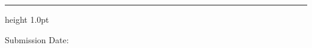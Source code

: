 \begin{titlepage}
\begin{singlespace}
\begin{center}
        \vfill
        
        \hrule height 1.0pt
        \vspace{0.15in}
        
        {\large Submission Date: \printdate}
        
        \vspace*{0.1in}
    \end{center}
    \end{singlespace}
\end{titlepage}
